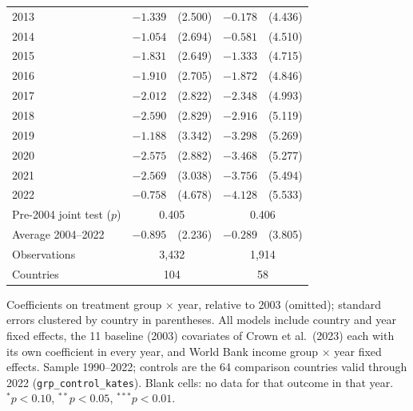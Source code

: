 \begin{table}[htbp]
\begin{tabular}{lcccc}
2013 & $-1.339$ & (2.500) & $-0.178$ & (4.436) \\
2014 & $-1.054$ & (2.694) & $-0.581$ & (4.510) \\
2015 & $-1.831$ & (2.649) & $-1.333$ & (4.715) \\
2016 & $-1.910$ & (2.705) & $-1.872$ & (4.846) \\
2017 & $-2.012$ & (2.822) & $-2.348$ & (4.993) \\
2018 & $-2.590$ & (2.829) & $-2.916$ & (5.119) \\
2019 & $-1.188$ & (3.342) & $-3.298$ & (5.269) \\
2020 & $-2.575$ & (2.882) & $-3.468$ & (5.277) \\
2021 & $-2.569$ & (3.038) & $-3.756$ & (5.494) \\
2022 & $-0.758$ & (4.678) & $-4.128$ & (5.533) \\
\midrule
Pre-2004 joint test ($p$) & \multicolumn{2}{c}{0.405} & \multicolumn{2}{c}{0.406} \\
Average 2004--2022 & $-0.895$ & (2.236) & $-0.289$ & (3.805) \\
Observations & \multicolumn{2}{c}{3,432} & \multicolumn{2}{c}{1,914} \\
Countries & \multicolumn{2}{c}{104} & \multicolumn{2}{c}{58} \\
\bottomrule
\end{tabular}
\par\vspace{4pt}
\begin{minipage}{\textwidth}\footnotesize Coefficients on treatment group $\times$ year, relative to 2003 (omitted); standard errors clustered by country in parentheses. All models include country and year fixed effects, the 11 baseline (2003) covariates of Crown et al.\ (2023) each with its own coefficient in every year, and World Bank income group $\times$ year fixed effects. Sample 1990--2022; controls are the 64 comparison countries valid through 2022 (\texttt{grp\_control\_kates}). Blank cells: no data for that outcome in that year. $^{*}p<0.10$, $^{**}p<0.05$, $^{***}p<0.01$.\end{minipage}
\end{table}
